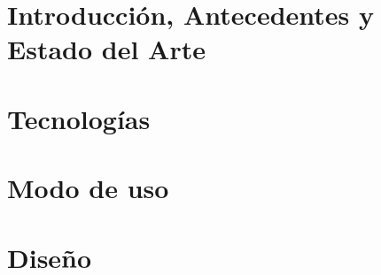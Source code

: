\documentclass[spanish,a4paper,12pt,oneside]{extreport}
\begin{document}

{\hypersetup{linkcolor=black}
\tableofcontents

\newpage{\pagestyle{empty}}

\listoffigures

\newpage{\pagestyle{empty}}

\listoftables
}

\newpage{\pagestyle{empty}}

\newpage
\thispagestyle{empty}

\renewcommand{\thepage}{\arabic{page}}
\setcounter{page}{1}
\pagestyle{plain}

\chapter{\LARGE Introducción, Antecedentes y Estado del Arte}
\label{chapter:intro}



\newpage{\pagestyle{empty}}
\thispagestyle{empty}

\chapter{\LARGE Tecnologías}
\label{chapter:dos}



\newpage{\pagestyle{empty}}
\thispagestyle{empty}

\chapter{\LARGE Modo de uso}
\label{chapter:modo-de-uso}


\newpage{\pagestyle{empty}}
\thispagestyle{empty}

\chapter{\LARGE Diseño}
\label{chapter:tres}
\end{document}
